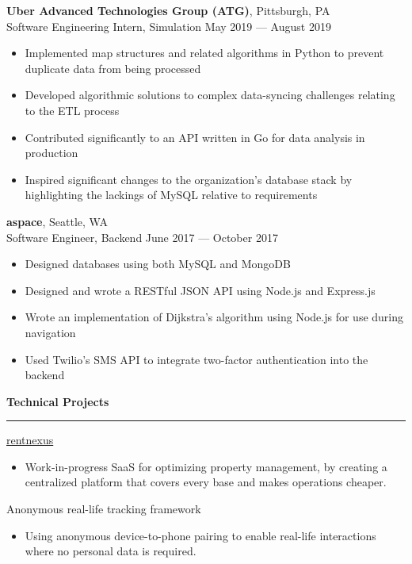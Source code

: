 \documentclass[11pt]{article}
\begin{document}
\begin{flushleft}
		\textbf{Uber Advanced Technologies Group (ATG)}, Pittsburgh, PA\\
		{\small Software Engineering Intern, Simulation \hfill May 2019 --- August 2019}
		\vspace{-1.25mm}
		\begin{itemize}
			\item Implemented map structures and related algorithms in Python to prevent duplicate data from being processed
			\vspace{-1.5mm}
			\item Developed algorithmic solutions to complex data-syncing challenges relating to the ETL process
			\vspace{-1.5mm}
			\item Contributed significantly to an API written in Go for data analysis in production
			\vspace{-1.5mm}
			\item Inspired significant changes to the organization's database stack by highlighting the lackings of MySQL relative to requirements
		\end{itemize}
	
		\textbf{aspace}, Seattle, WA\\
		{\small Software Engineer, Backend \hfill June 2017 --- October 2017}
		\vspace{-1.25mm}
		\begin{itemize}
			\item Designed databases using both MySQL and MongoDB
			\vspace{-1.5mm}
			\item Designed and wrote a RESTful JSON API using Node.js and Express.js
			\vspace{-1.5mm}
			\item Wrote an implementation of Dijkstra's algorithm using Node.js for use during navigation
			\vspace{-1.5mm}
			\item Used Twilio's SMS API to integrate two-factor authentication into the backend
		\end{itemize}
		
		\vspace{1.5mm}
		{\large \raggedright \textbf{Technical Projects}}
		\vspace{1.25mm}
	
		\hrule
	
		\vspace{2.25mm}
		\href{https://rentnexus.net}{rentnexus}
		\vspace{-1.25mm}
		\begin{itemize}
			\item Work-in-progress SaaS for optimizing property management, by creating a centralized platform that covers every base and makes operations cheaper.
		\end{itemize}
		Anonymous real-life tracking framework
		\vspace{-1.25mm}
		\begin{itemize}
			\item Using anonymous device-to-phone pairing to enable real-life interactions where no personal data is required.
		\end{itemize}


\end{flushleft}
\end{document}
